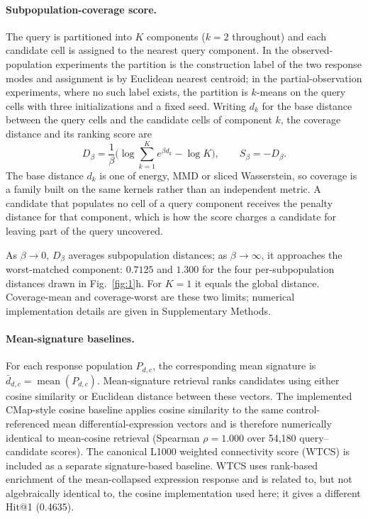 \documentclass[11pt,letterpaper]{article}
\newcommand{\HITWTCS}{0.4635}
\begin{document}
\paragraph{Subpopulation-coverage score.}
The query is partitioned into $K$ components ($k=2$ throughout) and each candidate cell is
assigned to the nearest query component. In the observed-population experiments the partition is
the construction label of the two response modes and assignment is by Euclidean nearest centroid;
in the partial-observation experiments, where no such label exists, the partition is $k$-means on
the query cells with three initializations and a fixed seed. Writing
$d_k$ for the base distance between the query cells and the candidate cells of
component $k$, the coverage distance and its ranking score are
\[
D_\beta=\frac{1}{\beta}\Big(\log\sum_{k=1}^{K}e^{\beta d_k}-\log K\Big),
\qquad
S_\beta=-D_\beta .
\]
The base distance $d_k$ is one of energy, MMD or sliced Wasserstein, so coverage is a
family built on the same kernels rather than an independent metric. A candidate that
populates no cell of a query component receives the penalty distance for that
component, which is how the score charges a candidate for leaving part of the query
uncovered.

As $\beta\rightarrow0$, $D_\beta$ averages subpopulation distances; as
$\beta\rightarrow\infty$, it approaches the worst-matched component: $0.7125$ and
$1.300$ for the four per-subpopulation distances drawn in Fig.~\ref{fig:1}h. For $K=1$
it equals the global distance. Coverage-mean and coverage-worst are these two limits; numerical
implementation details are given in Supplementary Methods.

\paragraph{Mean-signature baselines.}
For each response population $P_{d,c}$, the corresponding mean signature is
$\bar d_{d,c}=\operatorname{mean}(P_{d,c})$. Mean-signature retrieval ranks candidates
using either cosine similarity or Euclidean distance between these vectors. The
implemented CMap-style cosine baseline applies cosine similarity to the same
control-referenced mean differential-expression vectors and is therefore numerically
identical to mean-cosine retrieval (Spearman $\rho=1.000$ over 54,180 query--candidate
scores). The canonical L1000 weighted connectivity score
(WTCS)\cite{ref2} is included as a separate signature-based baseline. WTCS uses rank-based
enrichment of the mean-collapsed expression response and is related to, but not
algebraically identical to, the cosine implementation used here; it gives a different
Hit@1 (\HITWTCS).
\end{document}

